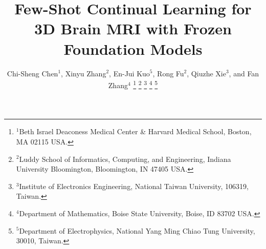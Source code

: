 \documentclass[journal,twoside,web]{ieeecolor}
\begin{document}
\title{Few-Shot Continual Learning for 3D Brain MRI with Frozen Foundation Models}


\author{Chi-Sheng Chen$^{1}$,
Xinyu Zhang$^{2}$,
En-Jui Kuo$^{5}$,
Rong Fu$^{2}$,
Qiuzhe Xie$^{3}$,
and Fan Zhang$^{4}$
\thanks{$^{1}$Beth Israel Deaconess Medical Center \& Harvard Medical School, Boston, MA 02115 USA.}
\thanks{$^{2}$Luddy School of Informatics, Computing, and Engineering, Indiana University Bloomington, Bloomington, IN 47405 USA.}
\thanks{$^{3}$Institute of Electronics Engineering, National Taiwan University, 106319, Taiwan.}
\thanks{$^{4}$Department of Mathematics, Boise State University, Boise, ID 83702 USA.}
\thanks{$^{5}$Department of Electrophysics, National Yang Ming Chiao Tung University, 30010, Taiwan.}}

\maketitle
\end{document}
